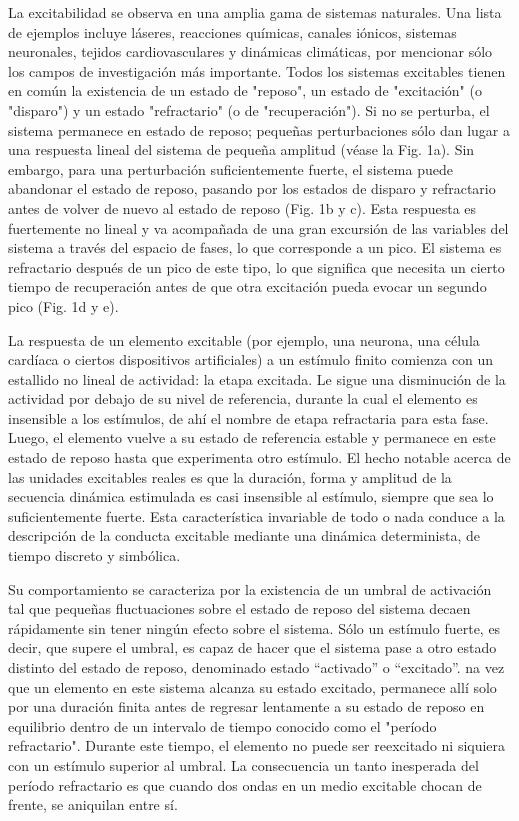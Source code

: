 La excitabilidad se observa en una amplia gama de sistemas naturales. Una lista de ejemplos incluye láseres, reacciones químicas, canales iónicos, sistemas neuronales, tejidos cardiovasculares y dinámicas climáticas, por mencionar sólo los campos de investigación más importante. Todos los sistemas excitables tienen en común la existencia de un estado de "reposo", un estado de "excitación" (o "disparo") y un estado "refractario" (o de "recuperación"). Si no se perturba, el sistema permanece en estado de reposo; pequeñas perturbaciones sólo dan lugar a una respuesta lineal del sistema de pequeña amplitud (véase la Fig. 1a). Sin embargo, para una perturbación suficientemente fuerte, el sistema puede abandonar el estado de reposo, pasando por los estados de disparo y refractario antes de volver de nuevo al estado de reposo (Fig. 1b y c). Esta respuesta es fuertemente no lineal y va acompañada de una gran excursión de las variables del sistema a través del espacio de fases, lo que corresponde a un pico. El sistema es refractario después de un pico de este tipo, lo que significa que necesita un cierto tiempo de recuperación antes de que otra excitación pueda evocar un segundo pico (Fig. 1d y e).



La respuesta de un elemento excitable (por ejemplo, una neurona, una célula cardíaca o ciertos dispositivos artificiales) a un estímulo finito comienza con un estallido no lineal de actividad: la etapa excitada. Le sigue una disminución de la actividad por debajo de su nivel de referencia, durante la cual el elemento es insensible a los estímulos, de ahí el nombre de etapa refractaria para esta fase. Luego, el elemento vuelve a su estado de referencia estable y permanece en este estado de reposo hasta que experimenta otro estímulo. El hecho notable acerca de las unidades excitables reales es que la duración, forma y amplitud de la secuencia dinámica estimulada es casi insensible al estímulo, siempre que sea lo suficientemente fuerte. Esta característica invariable de todo o nada conduce a la descripción de la conducta excitable mediante una dinámica determinista, de tiempo discreto y simbólica.


Su comportamiento se caracteriza por la existencia de un umbral de activación tal que pequeñas fluctuaciones sobre el estado de reposo del sistema decaen rápidamente sin tener ningún efecto sobre el sistema. Sólo un estímulo fuerte, es decir, que supere el umbral, es capaz de hacer que el sistema pase a otro estado distinto del estado de reposo, denominado estado “activado” o “excitado”. na vez que un elemento en este sistema alcanza su estado excitado, permanece allí solo por una duración finita antes de regresar lentamente a su estado de reposo en equilibrio dentro de un intervalo de tiempo conocido como el "período refractario". Durante este tiempo, el elemento no puede ser reexcitado ni siquiera con un estímulo superior al umbral. La consecuencia un tanto inesperada del período refractario es que cuando dos ondas en un medio excitable chocan de frente, se aniquilan entre sí.


